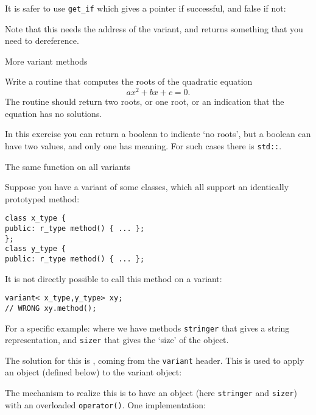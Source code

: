 It is safer to use \lstinline{get_if} which gives a pointer
if successful, and false if not:

Note that this needs the address of the variant, and returns
something that you need to dereference.

\begin{slide}{More variant methods}
  \label{sl:cpp-variant}
\end{slide}

\begin{exercise}
  \label{ex:quad-roots}
  Write a routine that computes the roots of the quadratic equation
  \[ ax^2+bx+c=0. \]
  The routine should return two roots, or one root, or an indication
  that the equation has no solutions.
\end{exercise}

In this exercise you can return a boolean to indicate `no roots', but
a boolean can have two values, and only one has meaning. For such
cases there is \lstinline{std::}.

 {The same function on all variants}

Suppose you have a variant of some classes,
which all support an identically prototyped method:
\begin{lstlisting}
class x_type {
public: r_type method() { ... };
};
class y_type {
public: r_type method() { ... };
\end{lstlisting}
It is not directly possible to call this method on a variant:
\begin{lstlisting}
variant< x_type,y_type> xy;
// WRONG xy.method();
\end{lstlisting}

For a specific example:
%
%
where we have methods
\lstinline{stringer} that gives a string representation, and
\lstinline{sizer} that gives the `size' of the object.

The solution for this is ,
coming from the \lstinline+variant+ header.
This is used to apply an object (defined below) to the variant object:
%

The mechanism to realize this is to have an object
(here \lstinline{stringer} and \lstinline{sizer})
with an overloaded \lstinline+operator()+.
One implementation:
%

